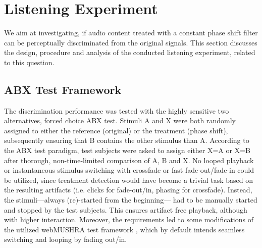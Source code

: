 \section{Listening Experiment}
\label{sec:listening-experiment}
%
We aim at investigating, if audio content treated with a constant phase
shift filter can be perceptually discriminated from the original signals.
%
This section discusses the design, procedure and analysis of the
conducted listening experiment, related to this question.
%
%
%
\subsection{ABX Test Framework}
The discrimination performance was tested with the highly sensitive two alternatives,
forced choice ABX test.
%
Stimuli A and X were both randomly assigned to either the reference (original)
or the treatment (phase shift), subsequently ensuring that B contains the other
stimulus than A.
%
According to the ABX test paradigm, test subjects were asked to assign either
X=A or X=B after thorough, non-time-limited comparison of A, B and X.
%
\NewL No looped playback or instantaneous stimulus switching with crossfade or
fast fade-out/fade-in could be utilized, since treatment detection would have become
a trivial task based on the resulting artifacts (i.e. clicks for fade-out/in,
phasing for crossfade).
%
Instead, the stimuli---always (re)-started from the beginning---%
had to be manually started and stopped by the test subjects.
%
This ensures artifact free playback, although with higher interaction.
%
Moreover, the requirements led to some modifications of the utilized webMUSHRA
test framework \cite{Schoeffler2018}, which by default intends seamless switching
and looping by fading out/in.
%
%
%
